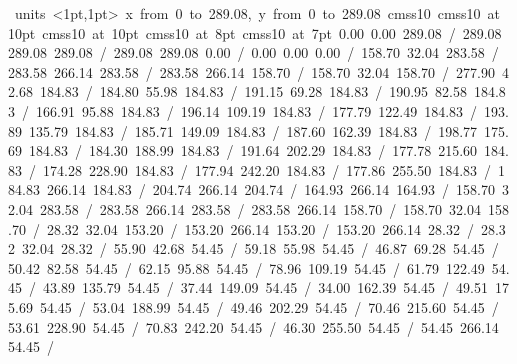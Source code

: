 \hbox{\beginpicture
\setcoordinatesystem units <1pt,1pt>
\setplotarea x from 0 to 289.08, y from 0 to 289.08
\setlinear
\font\picfont cmss10\picfont
\font\picfont cmss10 at 10pt\picfont
\font\picfont cmss10 at 10pt\picfont
\font\picfont cmss10 at 8pt\picfont
\font\picfont cmss10 at 7pt\picfont
\setsolid
{} 0.00 0.00 289.08 /
 289.08 289.08 289.08 /
 289.08 289.08 0.00 /
 0.00 0.00 0.00 /
\setsolid
{} 158.70 32.04 283.58 /
 283.58 266.14 283.58 /
 283.58 266.14 158.70 /
 158.70 32.04 158.70 /
\setsolid
{} 277.90 42.68 184.83 /
\setsolid
{} 184.80 55.98 184.83 /
\setsolid
{} 191.15 69.28 184.83 /
\setsolid
{} 190.95 82.58 184.83 /
\setsolid
{} 166.91 95.88 184.83 /
\setsolid
{} 196.14 109.19 184.83 /
\setsolid
{} 177.79 122.49 184.83 /
\setsolid
{} 193.89 135.79 184.83 /
\setsolid
{} 185.71 149.09 184.83 /
\setsolid
{} 187.60 162.39 184.83 /
\setsolid
{} 198.77 175.69 184.83 /
\setsolid
{} 184.30 188.99 184.83 /
\setsolid
{} 191.64 202.29 184.83 /
\setsolid
{} 177.78 215.60 184.83 /
\setsolid
{} 174.28 228.90 184.83 /
\setsolid
{} 177.94 242.20 184.83 /
\setsolid
{} 177.86 255.50 184.83 /
\setsolid
{} 184.83 266.14 184.83 /
\setdashpattern <4pt, 4pt>
 204.74 266.14 204.74 /
\setdashpattern <4pt, 4pt>
 164.93 266.14 164.93 /
\setsolid
{} 158.70 32.04 283.58 /
 283.58 266.14 283.58 /
 283.58 266.14 158.70 /
 158.70 32.04 158.70 /
\setsolid
{} 28.32 32.04 153.20 /
 153.20 266.14 153.20 /
 153.20 266.14 28.32 /
 28.32 32.04 28.32 /
\setsolid
{} 55.90 42.68 54.45 /
\setsolid
{} 59.18 55.98 54.45 /
\setsolid
{} 46.87 69.28 54.45 /
\setsolid
{} 50.42 82.58 54.45 /
\setsolid
{} 62.15 95.88 54.45 /
\setsolid
{} 78.96 109.19 54.45 /
\setsolid
{} 61.79 122.49 54.45 /
\setsolid
{} 43.89 135.79 54.45 /
\setsolid
{} 37.44 149.09 54.45 /
\setsolid
{} 34.00 162.39 54.45 /
\setsolid
{} 49.51 175.69 54.45 /
\setsolid
{} 53.04 188.99 54.45 /
\setsolid
{} 49.46 202.29 54.45 /
\setsolid
{} 70.46 215.60 54.45 /
\setsolid
{} 53.61 228.90 54.45 /
\setsolid
{} 70.83 242.20 54.45 /
\setsolid
{} 46.30 255.50 54.45 /
\setsolid
{} 54.45 266.14 54.45 /
}
